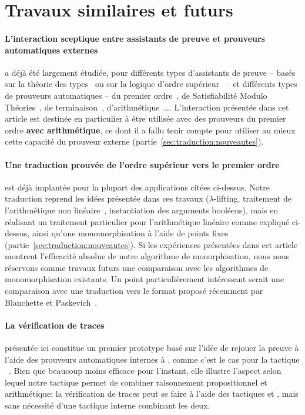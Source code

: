 \section{Travaux similaires et futurs}
\label{sec:similaires}

\paragraph{L'interaction sceptique entre assistants de preuve et
  prouveurs automatiques externes}
a déjà été largement étudiée, pour différents types d'assistants de
preuve -- basés sur la théorie des
types~\cite{DBLP:conf/cpp/ArmandFGKTW11,DBLP:conf/types/Besson06} ou sur
la logique d'ordre supérieur~\cite{Paulson10,KaliszykU12} -- et
différents types de prouveurs automatiques -- du premier
ordre~\cite{Paulson10}, de Satisfiabilité Modulo
Théories~\cite{Paulson10,DBLP:conf/cpp/ArmandFGKTW11,Bohme12}, de
terminaison~\cite{KaliszykU12},
d'arithmétique~\cite{DBLP:conf/types/Besson06}\dots. L'interaction
présentée dans cet article est destinée en particulier à être utilisée
avec des prouveurs du premier ordre \textbf{avec arithmétique}, ce dont
il a fallu tenir compte pour utiliser au mieux cette capacité du
prouveur externe (partie~\ref{sec:traduction:nouveautes}).

\paragraph{Une traduction prouvée de l'ordre supérieur vers le premier
  ordre}
est déjà implantée pour la plupart des applications citées ci-dessus.
Notre traduction reprend les idées présentée dans ces travaux
($\lambda$-lifting, traitement de l'arithmétique non
linéaire~\cite{Bohme12}, instantiation des arguments booléens), mais en
réalisant un traitement particulier pour l'arithmétique linéaire comme
expliqué ci-dessus, ainsi qu'une monomorphisation à l'aide de points
fixes (partie~\ref{sec:traduction:nouveautes}). Si les expériences
présentées dans cet article montrent l'efficacité absolue de notre
algorithme de monorphisation, nous nous réservons comme travaux futurs
une comparaison avec les algorithmes de monomorphisation existants. Un
point particulièrement intéressant serait une comparaison avec une
traduction vers le format \tffone proposé récemment par Blanchette et
Paskevich~\cite{DBLP:conf/cade/BlanchetteP13}.

\paragraph{La vérification de traces} présentée ici constitue un premier
prototype basé sur l'idée de rejouer la preuve à l'aide des prouveurs
automatiques internes à \holfour, comme c'est le cas pour la tactique
\sledgehammer~\cite{Paulson10}. Bien que beaucoup moins efficace pour
l'instant, elle illustre l'aspect selon lequel notre tactique permet de
combiner raisonnement propositionnel et arithmétique: la vérification de
traces peut se faire à l'aide des tactiques \metistac et \coopertac,
mais sans nécessité d'une tactique interne combinant les deux.

